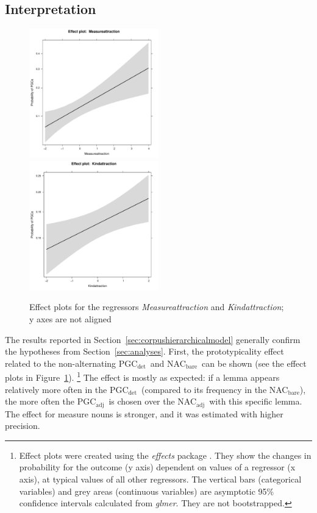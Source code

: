 \documentclass[USenglish]{article}
\newcommand{\Sub}[1]{\ensuremath{\mathrm{_{#1}}}}
\newcommand{\NACb}{NAC\Sub{bare}}
\newcommand{\NACa}{NAC\Sub{adj}}
\newcommand{\PGCd}{PGC\Sub{det}}
\newcommand{\PGCa}{PGC\Sub{adj}}
\begin{document}


\subsection{Interpretation}
\label{sec:interpretation}


\begin{figure}[h!]
  \centering
  \includegraphics[width=0.5\textwidth]{../R/output/corpus_Measureattraction}~\includegraphics[width=0.5\textwidth]{../R/output/corpus_Kindattraction}
  \caption{Effect plots for the regressors \textit{Measureattraction} and \textit{Kindattraction}; y axes are not aligned}
  \label{fig:eff:attraction}
\end{figure}

The results reported in Section~\ref{sec:corpushierarchicalmodel} generally confirm the hypotheses from Section~\ref{sec:analyses}.
First, the prototypicality effect related to the non-alternating \PGCd\ and \NACb\ can be shown (see the effect plots in Figure~\ref{fig:eff:attraction}).%
\footnote{Effect plots were created using the \textit{effects} package \citep{Fox2003}.
They show the changes in probability for the outcome (y axis) dependent on values of a regressor (x axis), at typical values of all other regressors.
The vertical bars (categorical variables) and grey areas (continuous variables) are asymptotic 95\% confidence intervals calculated from \textit{glmer}.
They are not bootstrapped.}
The effect is mostly as expected:
if a lemma appears relatively more often in the \PGCd\ (compared to its frequency in the \NACb), the more often the \PGCa\ is chosen over the \NACa\ with this specific lemma.
The effect for measure nouns is stronger, and it was estimated with higher precision.
\end{document}
